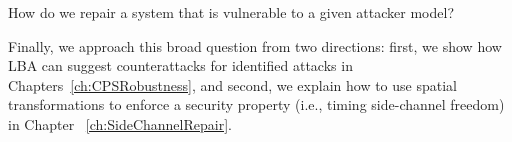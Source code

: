 \begin{question}
\label{que:Repair}
How do we repair a system that is vulnerable to a given attacker model?
\end{question}
Finally, we approach this broad question from two directions: first, we show how LBA can suggest counterattacks for identified attacks in Chapters~\ref{ch:CPSRobustness}, and second, we explain how to use spatial transformations to enforce a security property (i.e., timing side-channel freedom) in Chapter ~\ref{ch:SideChannelRepair}. 


















